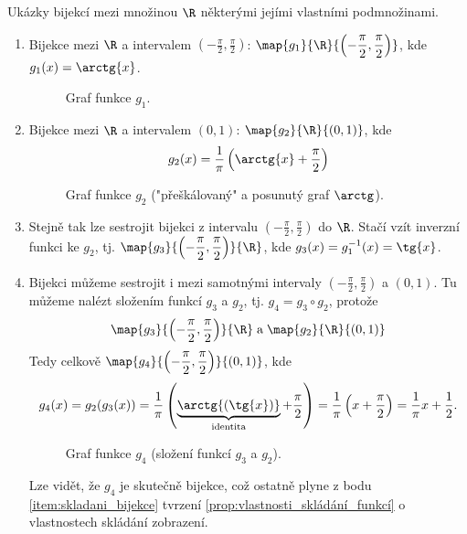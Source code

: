 \begin{example}\label{ex:bijekce_realna_cisla}
    Ukázky bijekcí mezi množinou $\R$ některými jejími vlastními podmnožinami.
    \begin{enumerate}[label=(\roman*)]
        \item\label{item:funkce_arctg} Bijekce mezi $\R$ a intervalem $\displaystyle\left(-\frac{\pi}{2},\frac{\pi}{2}\right)$: $\displaystyle\map{g_1}{\R}{\left(-\frac{\pi}{2},\frac{\pi}{2}\right)}$, kde $g_1(x)=\arctg{x}$.
        \begin{figure}[H]
            \centering
            
            \caption{Graf funkce $g_1$.}
            \label{fig:graf_g1}
        \end{figure}
        \item\label{item:bijekce_0_a_1} Bijekce mezi $\R$ a intervalem $(0,1)$: $\map{g_2}{\R}{(0,1)}$, kde
        \begin{equation*}
            g_2(x)=\frac{1}{\pi}\left(\arctg{x}+\frac{\pi}{2}\right)
        \end{equation*}
        \begin{figure}[H]
            \centering
            
            \caption{Graf funkce $g_2$ ("přeškálovaný" a posunutý graf $\arctg$).}
            \label{fig:graf_g2}
        \end{figure}
        \item\label{item:funkce_tg} Stejně tak lze sestrojit bijekci z intervalu $\displaystyle\left(-\frac{\pi}{2},\frac{\pi}{2}\right)$ do $\R$. Stačí vzít inverzní funkci ke $g_2$, tj. $\displaystyle\map{g_3}{\left(-\frac{\pi}{2},\frac{\pi}{2}\right)}{\R}$, kde $g_3(x)=g_1^{-1}(x)=\tg{x}$.
        \item\label{item:bijekce_slozena} Bijekci můžeme sestrojit i mezi samotnými intervaly $\displaystyle\left(-\frac{\pi}{2},\frac{\pi}{2}\right)$ a $(0,1)$. Tu můžeme nalézt složením funkcí $g_3$ a $g_2$, tj. $g_4=g_3\circ g_2$, protože
        \begin{equation*}
            \map{g_3}{\left(-\frac{\pi}{2},\frac{\pi}{2}\right)}{\R}\;\text{a}\;\map{g_2}{\R}{(0,1)}
        \end{equation*}
        Tedy celkově $\displaystyle\map{g_4}{\left(-\frac{\pi}{2},\frac{\pi}{2}\right)}{(0,1)}$, kde
        \begin{equation*}
            g_4(x)=g_2(g_3(x))=\frac{1}{\pi}\left(\underbrace{\arctg{(\tg{x})}}_{\text{identita}}+\frac{\pi}{2}\right)=\frac{1}{\pi}\left(x+\frac{\pi}{2}\right)=\frac{1}{\pi}x+\frac{1}{2}.
        \end{equation*}
        \begin{figure}[H]
            \centering
            
            \caption{Graf funkce $g_4$ (složení funkcí $g_3$ a $g_2$).}
            \label{fig:graf_g4}
        \end{figure}
        Lze vidět, že $g_4$ je skutečně bijekce, což ostatně plyne z bodu \ref{item:skladani_bijekce} tvrzení \ref{prop:vlastnosti_skládání_funkcí} o vlastnostech skládání zobrazení.
    \end{enumerate}
\end{example}